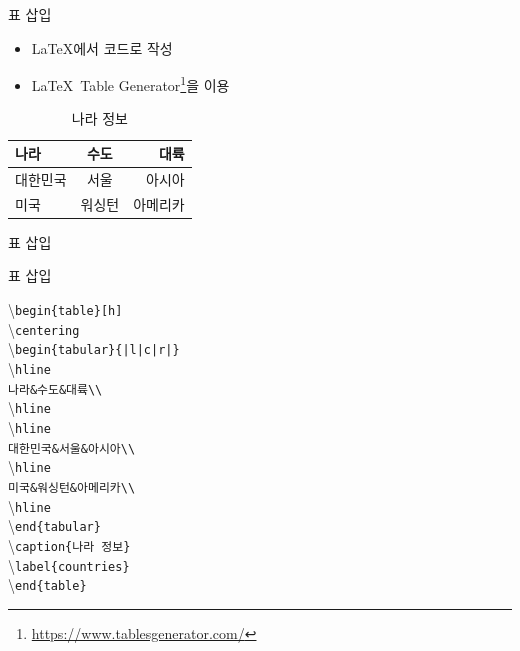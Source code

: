 \documentclass[12pt]{gshs_lecture}
\newenvironment{codeblock}[1]{
	\begin{block}{#1}
		\setstretch{1.0}
		\begin{small}
}{
		\end{small}
	\end{block}
}
\begin{document}
\begin{frame}[t]{표 삽입}
	
	\begin{itemize}
		\item \LaTeX 에서 코드로 작성
		\item \LaTeX\ Table Generator\footnote[frame]{\url{https://www.tablesgenerator.com/}}을 이용
	\end{itemize}
	
	\begin{table}[h]
		\centering
		\begin{tabular}{|l|c|r|}
			\hline
			나라&수도&대륙\\
			\hline
			\hline
			대한민국&서울&아시아\\
			\hline
			미국&워싱턴&아메리카\\
			\hline
		\end{tabular}
		\caption{나라 정보}
		\label{countries}
	\end{table}
\end{frame}

\begin{frame}[t]{표 삽입}
	
	\begin{codeblock}{표 삽입}
		\textbackslash \texttt{begin\{table\}[h]}\\
		\hspace{6mm} \textbackslash \texttt{centering}\\
		\hspace{6mm} \textbackslash \texttt{begin\{tabular\}\{|l|c|r|\}}\\
		\hspace{14mm} \textbackslash \texttt{hline}\\
		\hspace{14mm} \texttt{나라\&수도\&대륙\textbackslash \textbackslash}\\
		\hspace{14mm} \textbackslash \texttt{hline}\\
		\hspace{14mm} \textbackslash \texttt{hline}\\
		\hspace{14mm} \texttt{대한민국\&서울\&아시아\textbackslash \textbackslash}\\
		\hspace{14mm} \textbackslash \texttt{hline}\\
		\hspace{14mm} \texttt{미국\&워싱턴\&아메리카\textbackslash \textbackslash}\\
		\hspace{14mm} \textbackslash \texttt{hline}\\
		\hspace{6mm} \textbackslash \texttt{end\{tabular\}}\\
		\hspace{6mm} \textbackslash \texttt{caption\{나라 정보\}}\\
		\hspace{6mm} \textbackslash \texttt{label\{countries\}}\\
		\textbackslash\texttt{end\{table\}}
	\end{codeblock}
	
\end{frame}
\end{document}
